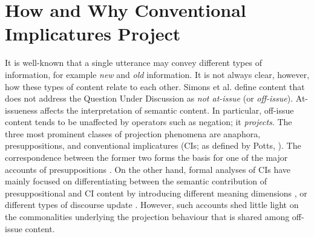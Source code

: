 \documentclass[a4paper,12pt]{article}
\begin{document}
\pagestyle{empty}
\thispagestyle{empty}

\section*{How and Why Conventional Implicatures Project}

\noindent 
It is well-known that a single utterance may convey different types of
information, for example \emph{new} and \emph{old} information. It is not
always clear, however, how these types of content relate to each other.
Simons et al. \cite{simons2010projects} define content that does not
address the Question Under Discussion
\cite[cf.][]{roberts1996information-short} as \textit{not at-issue} (or
\emph{off-issue}).  At-issueness affects the interpretation of semantic
content. In particular, off-issue content tends to be unaffected by
operators such as negation; it \emph{projects}.  The three most prominent
classes of projection phenomena are anaphora, presuppositions, and
conventional implicatures (CIs; as defined by Potts, \cite{potts2005logic}). 
The correspondence between the former two forms the basis for one of the
major accounts of presuppositions
\citep{sandt1992presupposition-short,geurts1999presuppositions}. On the
other hand, formal analyses of CIs have mainly focused on differentiating
between the semantic contribution of presuppositional and CI content by
introducing different meaning dimensions
\cite{potts2005logic,nouwen2007appositives-short}, or different types of
discourse update \citep{anderbois2010crossing}.  However, such accounts shed
little light on the commonalities underlying the projection behaviour that
is shared among off-issue content.
\end{document}
